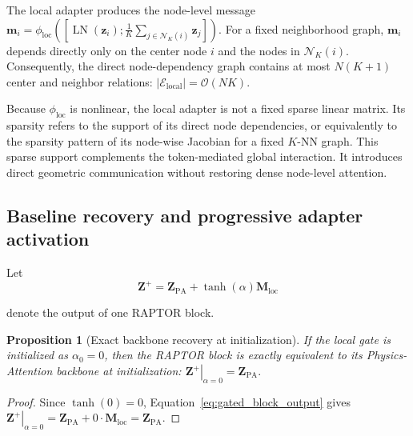\documentclass[a4paper,fleqn]{cas-sc}
\newtheorem{proposition}{Proposition}[section]
\begin{document}
The local adapter produces the node-level message $\mathbf m_i
    =
    \phi_{\mathrm{loc}}
    \left(
        \left[
            \operatorname{LN}(\mathbf z_i);
            \frac{1}{K}
            \sum_{j\in\mathcal N_K(i)}
            \mathbf z_j
        \right]
    \right).$
For a fixed neighborhood graph, \(\mathbf m_i\) depends directly only on the center node \(i\) and the nodes in \(\mathcal N_K(i)\). Consequently, the direct node-dependency graph contains at most \(N(K+1)\) center and
neighbor relations: $ |\mathcal E_{\mathrm{local}}|
    =
    \mathcal O(NK).$

Because \(\phi_{\mathrm{loc}}\) is nonlinear, the local adapter is not a fixed sparse linear matrix. Its sparsity refers to the support of its direct node dependencies, or equivalently to the sparsity pattern of its node-wise Jacobian for a fixed \(K\)-NN graph. This sparse support complements the token-mediated global interaction.
It introduces direct geometric communication without restoring dense node-level attention.

\subsection{Baseline recovery and progressive adapter activation}
\label{subsec:baseline_recovery}

Let
\begin{equation}
    \mathbf Z^{+}
    =
    \mathbf Z_{\mathrm{PA}}
    +
    \tanh(\alpha)\mathbf M_{\mathrm{loc}}
    \label{eq:gated_block_output}
\end{equation}

denote the output of one RAPTOR block.

\begin{proposition}[Exact backbone recovery at initialization]
\label{prop:baseline_recovery}
If the local gate is initialized as \(\alpha_0=0\), then the RAPTOR block is exactly equivalent to its Physics-Attention backbone at initialization: $ \left.
        \mathbf Z^{+}
    \right|_{\alpha=0}
    =
    \mathbf Z_{\mathrm{PA}}.$

\end{proposition}

\begin{proof}
Since \(\tanh(0)=0\), Equation~\eqref{eq:gated_block_output} gives $ \left.
        \mathbf Z^{+}
    \right|_{\alpha=0}
    =
    \mathbf Z_{\mathrm{PA}}
    +
    0\cdot\mathbf M_{\mathrm{loc}}
    =
    \mathbf Z_{\mathrm{PA}}.$
\end{proof}
\end{document}
